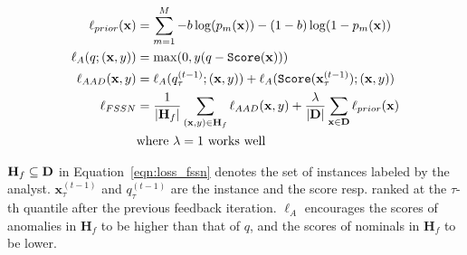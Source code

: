 \documentclass{article}
\begin{document}
\begin{align}
\ell_{prior}({\bf x}) &= \sum_{m=1}^M{-b\log(p_m({\bf x})) -(1 - b)\log(1 - p_m({\bf x}))} \label{eqn:prior} \\
\ell_A(q; ({\bf x}, y)) &= \max(0, y (q - \text{\texttt{Score}$({\bf x})$})) \label{eqn:la_loss} \\
\ell_{AAD}({\bf x}, y) &= \ell_A(q_{\tau}^{(t-1)}; ({\bf x}, y)) + \ell_A(\text{\texttt{Score}}({\bf x}_{\tau}^{(t-1)}); ({\bf x}, y)) \label{eqn:aad_loss} \\
\ell_{FSSN} &= \frac{1}{|{\bf H}_f|} \sum_{({\bf x}, y) \in {\bf H}_f} \ell_{AAD}({\bf x}, y) + \frac{\lambda}{|{\bf D}|} \sum_{{\bf x} \in {\bf D}}\ell_{prior}({\bf x}) \label{eqn:loss_fssn} \\
& \text{where $\lambda=1$ works well} \nonumber
\end{align}

$\mathbf{H}_f \subseteq {\bf D}$ in Equation~\ref{eqn:loss_fssn} denotes the set of instances labeled by the analyst. ${\mathbf x}_{\tau}^{(t-1)}$ and $q_{\tau}^{(t-1)}$ are the instance and the score resp. ranked at the $\tau$-th quantile after the previous feedback iteration. $\ell_{A}$ encourages the scores of anomalies in $\mathbf{H}_f$ to be higher than that of $q$, and the scores of nominals in $\mathbf{H}_f$ to be lower.
\end{document}
